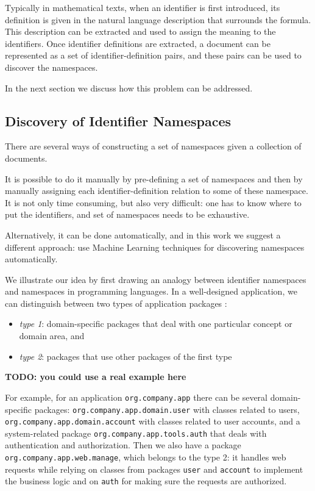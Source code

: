 Typically in mathematical texts, when an identifier is first introduced,
its definition is given in the natural language description that surrounds
the formula. This description can be extracted and used to assign the meaning to
the identifiers. Once identifier definitions are extracted, a document
can be represented as a set of identifier-definition pairs,
and these pairs can be used to discover the namespaces.


In the next section we discuss how this problem can be addressed.


\subsection{Discovery of Identifier Namespaces} \label{sec:discovery-namespaces}

There are several ways of constructing a set of namespaces given a collection 
of documents. 

It is possible to do it manually by pre-defining a set of namespaces and 
then by manually assigning each identifier-definition relation to some of these
namespace. It is not only time consuming, but also very difficult: one has 
to know where to put the identifiers, and set of namespaces needs to be exhaustive. 

Alternatively, it can be done automatically, and in this work we suggest a different 
approach: use Machine Learning techniques for discovering namespaces automatically.

We illustrate our idea by first drawing an analogy between identifier
namespaces and namespaces in programming languages. In a well-designed application, 
we can distinguish between two types of application packages \cite{evans2004domain}:

\begin{itemize}
  \item \emph{type 1}: domain-specific packages that deal with one particular
    concept or domain area, and
  \item \emph{type 2}: packages that use other packages of
    the first type
\end{itemize}

\textbf{TODO: you could use a real example here}


For example, for an application \verb|org.company.app|
there can be several domain-specific packages: \verb|org.company.app.domain.user|
with classes related to users, \verb|org.company.app.domain.account|
with classes related to user accounts, and a system-related package
\verb|org.company.app.tools.auth| that deals with authentication and
authorization. Then we also have a package \verb|org.company.app.web.manage|,
which belongs to the type 2: it handles web requests
while relying on classes from packages \verb|user| and \verb|account| to
implement the business logic and on \verb|auth| for making sure the
requests are authorized.

